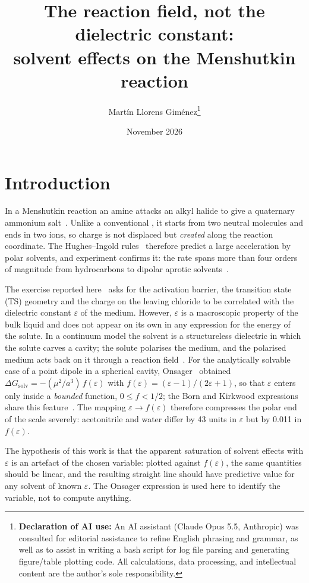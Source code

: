 \documentclass[10pt,a4paper]{article}
\title{The reaction field, not the dielectric constant:\\solvent effects on the Menshutkin reaction \ce{H3N + CH3Cl}}
\author{Martín Llorens Giménez\thanks{\textbf{Declaration of AI use:} An AI assistant (Claude Opus 5.5, Anthropic) was consulted for editorial assistance to refine English phrasing and grammar, as well as to assist in writing a bash script for log file parsing and generating figure/table plotting code. All calculations, data processing, and intellectual content are the author's sole responsibility.}}
\date{November 2026}
\begin{document}
\maketitle

\section{Introduction}

In a Menshutkin reaction an amine attacks an alkyl halide to give a
quaternary ammonium salt~\cite{Menschutkin1890}. Unlike a conventional
, it starts from two neutral molecules and ends in two ions, so
charge is not displaced but \emph{created} along the reaction coordinate.
The Hughes--Ingold rules~\cite{Hughes1935} therefore predict a large
acceleration by polar solvents, and experiment confirms it: the rate spans
more than four orders of magnitude from hydrocarbons to dipolar aprotic
solvents~\cite{Reichardt2011}.

The exercise reported here~\cite{guion7} asks for the activation barrier,
the transition state (TS) geometry and the charge on the leaving chloride
to be correlated with the dielectric constant $\varepsilon$ of the medium.
However, $\varepsilon$ is a macroscopic property of the bulk liquid and
does not appear on its own in any expression for the energy of the solute.
In a continuum model the solvent is a structureless dielectric in which the
solute carves a cavity; the solute polarises the medium, and the polarised
medium acts back on it through a reaction field~\cite{Tomasi2005}. For the
analytically solvable case of a point dipole in a spherical cavity,
Onsager~\cite{Onsager1936} obtained
$\Delta G_\mathrm{solv} = -(\mu^{2}/a^{3})\,f(\varepsilon)$ with
$f(\varepsilon) = (\varepsilon-1)/(2\varepsilon+1)$, so that $\varepsilon$
enters only inside a \emph{bounded} function, $0 \leq f < 1/2$; the Born
and Kirkwood expressions share this feature~\cite{Kirkwood1934}. The
mapping $\varepsilon \rightarrow f(\varepsilon)$ therefore compresses the
polar end of the scale severely: acetonitrile and water differ by 43 units
in $\varepsilon$ but by 0.011 in $f(\varepsilon)$.

The hypothesis of this work is that the apparent saturation of solvent
effects with $\varepsilon$ is an artefact of the chosen variable: plotted
against $f(\varepsilon)$, the same quantities should be linear, and the
resulting straight line should have predictive value for any solvent of
known $\varepsilon$. The Onsager expression is used here to identify the
variable, not to compute anything.
\end{document}
